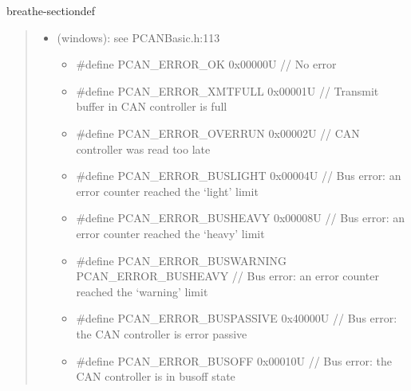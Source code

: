 \documentclass[a4paper,10pt,english]{sphinxmanual}
\begin{document}
\begin{fulllineitems}
\begin{sphinxuseclass}{breathe-sectiondef}
\begin{fulllineitems}
\begin{quote}
\begin{description}
\begin{itemize}
\begin{itemize}
\item {} 
 = CONNECTING :

\item {} 
 = CONNECTED

\item {} 
 = DISCONNECTING

\item {} 
 = NOT\_INITIALIZED

\item {} 
\sphinxAtStartPar
b3…b27: unused

\item {} 
\sphinxAtStartPar
I translate this into a simple bitpattern which is a counter : 000(does not occur), 001, 010, 011, 100, 101. Actually 011 means OK therefore. great.

\end{itemize}


\item {} 
\sphinxAtStartPar
{} \textendash{} (windows): see PCANBasic.h:113\begin{itemize}
\item {} 
\sphinxAtStartPar
\#define PCAN\_ERROR\_OK 0x00000U // No error

\item {} 
\sphinxAtStartPar
\#define PCAN\_ERROR\_XMTFULL 0x00001U // Transmit buffer in CAN controller is full

\item {} 
\sphinxAtStartPar
\#define PCAN\_ERROR\_OVERRUN 0x00002U // CAN controller was read too late

\item {} 
\sphinxAtStartPar
\#define PCAN\_ERROR\_BUSLIGHT 0x00004U // Bus error: an error counter reached the ‘light’ limit

\item {} 
\sphinxAtStartPar
\#define PCAN\_ERROR\_BUSHEAVY 0x00008U // Bus error: an error counter reached the ‘heavy’ limit

\item {} 
\sphinxAtStartPar
\#define PCAN\_ERROR\_BUSWARNING PCAN\_ERROR\_BUSHEAVY // Bus error: an error counter reached the ‘warning’ limit

\item {} 
\sphinxAtStartPar
\#define PCAN\_ERROR\_BUSPASSIVE 0x40000U // Bus error: the CAN controller is error passive

\item {} 
\sphinxAtStartPar
\#define PCAN\_ERROR\_BUSOFF 0x00010U // Bus error: the CAN controller is in bus\sphinxhyphen{}off state


\end{itemize}
\end{itemize}
\end{description}
\end{quote}
\end{fulllineitems}
\end{sphinxuseclass}
\end{fulllineitems}
\end{document}
